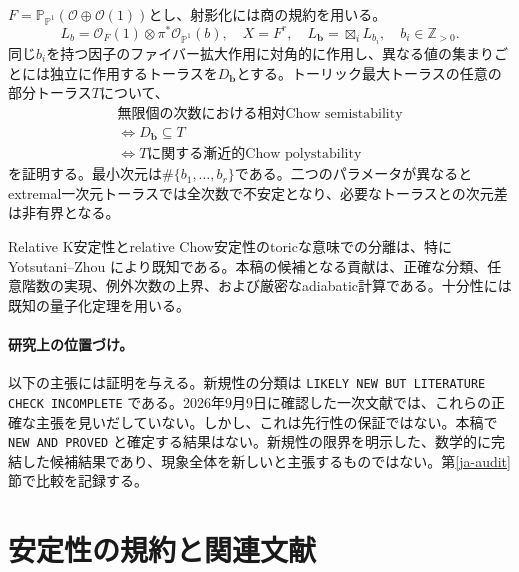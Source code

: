 \documentclass[12pt]{amsart}
\theoremstyle{definition}
\theoremstyle{remark}
\numberwithin{equation}{section}
\newcommand{\cO}{\mathcal{O}}
\newcommand{\Z}{\mathbb{Z}}
\newcommand{\mP}{\mathbb{P}}
\begin{document}
$F=\mP_{\mP^1}(\cO\oplus\cO(1))$とし、射影化には商の規約を用いる。
\begin{equation}\label{ja-family}
 L_b=\cO_F(1)\otimes\pi^*\cO_{\mP^1}(b),\quad
 X=F^r,\quad L_{\boldsymbol b}=\boxtimes_iL_{b_i},\quad b_i\in\Z_{>0}.
\end{equation}
同じ$b_i$を持つ因子のファイバー拡大作用に対角的に作用し、異なる値の集まりごとには独立に作用するトーラスを$D_{\boldsymbol b}$とする。トーリック最大トーラスの任意の部分トーラス$T$について、
\begin{equation}\label{ja-intro}
\begin{gathered}
\text{無限個の次数における相対Chow semistability}\\
\Longleftrightarrow D_{\boldsymbol b}\subseteq T\\
\Longleftrightarrow\text{$T$に関する漸近的Chow polystability}
\end{gathered}
\end{equation}
を証明する。最小次元は$\#\{b_1,\ldots,b_r\}$である。二つのパラメータが異なるとextremal一次元トーラスでは全次数で不安定となり、必要なトーラスとの次元差は非有界となる。

Relative K安定性とrelative Chow安定性のtoricな意味での分離は、特にYotsutani--Zhou \cite{ja-YZ}により既知である。本稿の候補となる貢献は、正確な分類、任意階数の実現、例外次数の上界、および厳密なadiabatic計算である。十分性には既知の量子化定理を用いる。

\paragraph{研究上の位置づけ。}
以下の主張には証明を与える。新規性の分類は
\texttt{LIKELY NEW BUT LITERATURE CHECK INCOMPLETE}
である。2026年9月9日に確認した一次文献では、これらの正確な主張を見いだしていない。しかし、これは先行性の保証ではない。本稿で
\texttt{NEW AND PROVED}
と確定する結果はない。新規性の限界を明示した、数学的に完結した候補結果であり、現象全体を新しいと主張するものではない。第\ref{ja-audit}節で比較を記録する。

\section{安定性の規約と関連文献}
\end{document}
